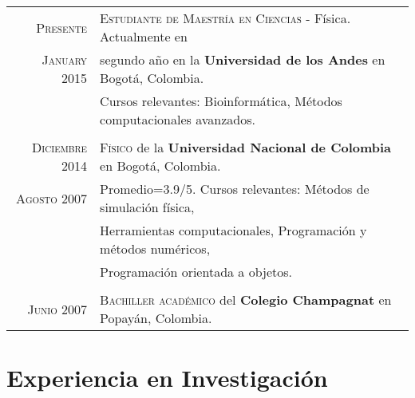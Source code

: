 \documentclass[a4paper,10pt]{article} %
\begin{document}
\begin{tabular}{rl}	

\textsc{Presente} & \textsc{Estudiante de Maestría en Ciencias} - Física. Actualmente en \\ 
\textsc{January 2015} & segundo año en la \textbf{Universidad de los Andes} en Bogot\'a, Colombia. \\
& Cursos relevantes: Bioinformática, Métodos computacionales avanzados. \\
\\
\textsc{Diciembre 2014} & \textsc{Físico} de la \textbf{Universidad Nacional de Colombia} en Bogot\'a, Colombia. \\ 
\textsc{Agosto 2007} &  Promedio=3.9/5. Cursos relevantes: Métodos de simulación física,  
\\& Herramientas computacionales, Programación y métodos numéricos,
\\& Programación orientada a objetos. \\
\\
\textsc{Junio 2007}& \textsc{}\textsc{Bachiller académico} del \normalsize\textbf{Colegio Champagnat} en Popay\'an, Colombia.\\

\end{tabular}


\color{OrangeRed}
\section{Experiencia en Investigación}
\color{black}
\end{document}
